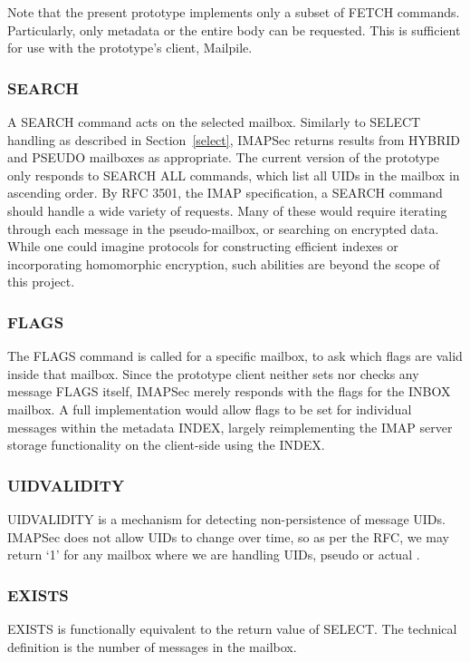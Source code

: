 \documentclass[pageno]{jpaper}
\newcommand{\project}{IMAPSec }
\begin{document}
Note that the present prototype implements only a subset of FETCH commands. Particularly, only metadata or the entire body can be requested. This is sufficient for use with the prototype's client, Mailpile.

\subsubsection{SEARCH} A SEARCH command acts on the selected mailbox. Similarly to SELECT handling as described in Section~\ref{select}, \project returns results from HYBRID and PSEUDO mailboxes as appropriate. The current version of the prototype only responds to SEARCH ALL commands, which list all UIDs in the mailbox in ascending order. By RFC 3501, the IMAP specification, a SEARCH command should handle a wide variety of requests. Many of these would require iterating through each message in the pseudo-mailbox, or searching on encrypted data. While one could imagine protocols for constructing efficient indexes or incorporating homomorphic encryption, such abilities are beyond the scope of this project.

\subsubsection{FLAGS} The FLAGS command is called for a specific mailbox, to ask which flags are valid inside that mailbox. Since the prototype client neither sets nor checks any message FLAGS itself, \project merely responds with the flags for the INBOX mailbox. A full implementation would allow flags to be set for individual messages within the metadata INDEX, largely reimplementing the IMAP server storage functionality on the client-side using the INDEX.

\subsubsection{UIDVALIDITY} UIDVALIDITY is a mechanism for detecting non-persistence of message UIDs. \project does not allow UIDs to change over time, so as per the RFC, we may return `1' for any mailbox where we are handling UIDs, pseudo or actual \cite{rfc3501}.

\subsubsection{EXISTS}
\label{exists}

EXISTS is functionally equivalent to the return value of SELECT. The technical definition is the number of messages in the mailbox.
\end{document}
